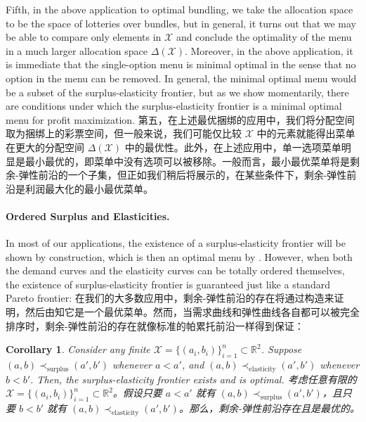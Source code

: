 \documentclass[12pt,letterpaper]{article}
\newenvironment{original}{\color{black}\noindent}{}
\newenvironment{translation}{\color{blue}\noindent}{}
\theoremstyle{plain}
\newtheorem{cor}{Corollary}
\theoremstyle{definition}
\theoremstyle{remark}
\newcommand{\R}{\mathds{R}}
\renewcommand{\1}{\mathds{1}}
\newcommand{\X}{\mathcal{X}}
\theoremstyle{definition}
\begin{document}
\begin{original}
Fifth, in the above application to optimal bundling, we take the allocation space to be the space of lotteries over bundles, but in general, it turns out that we may be able to compare only elements in $\mathcal{X}$ and conclude the optimality of the menu in a much larger allocation space $\Delta(\mathcal{X})$. Moreover, in the above application, it is immediate that the single-option menu is minimal optimal in the sense that no option in the menu can be removed. In general, the minimal optimal menu would be a subset of the surplus-elasticity frontier, but as we show momentarily, there are conditions under which the surplus-elasticity frontier is a minimal optimal menu for profit maximization.
\end{original}
\begin{translation}
第五，在上述最优捆绑的应用中，我们将分配空间取为捆绑上的彩票空间，但一般来说，我们可能仅比较 $\mathcal{X}$ 中的元素就能得出菜单在更大的分配空间 $\Delta(\mathcal{X})$ 中的最优性。此外，在上述应用中，单一选项菜单明显是最小最优的，即菜单中没有选项可以被移除。一般而言，最小最优菜单将是剩余-弹性前沿的一个子集，但正如我们稍后将展示的，在某些条件下，剩余-弹性前沿是利润最大化的最小最优菜单。
\end{translation}

\paragraph{Ordered Surplus and Elasticities.}\hspace{-2mm}\begin{original}In most of our applications, the existence of a surplus-elasticity frontier will be shown by construction, which is then an optimal menu by . However, when both the demand curves and the elasticity curves can be totally ordered themselves, the existence of surplus-elasticity frontier is guaranteed just like a standard Pareto frontier:
\end{original}
\begin{translation}
在我们的大多数应用中，剩余-弹性前沿的存在将通过构造来证明，然后由知它是一个最优菜单。然而，当需求曲线和弹性曲线各自都可以被完全排序时，剩余-弹性前沿的存在就像标准的帕累托前沿一样得到保证：
\end{translation}

\begin{cor}
\begin{original}
Consider any finite $\X = \{(a_i, b_i)\}_{i=1}^n\subset \R^2$.  Suppose $(a, b) \prec_{\text{surplus}} (a', b')$ whenever $a < a'$, and $(a, b) \prec_{\text{elasticity}} (a', b')$ whenever $b < b'$. Then, the surplus-elasticity frontier exists and is optimal.
\end{original}
\begin{translation}
考虑任意有限的 $\X = \{(a_i, b_i)\}_{i=1}^n\subset \R^2$。假设只要 $a < a'$ 就有 $(a, b) \prec_{\text{surplus}} (a', b')$，且只要 $b < b'$ 就有 $(a, b) \prec_{\text{elasticity}} (a', b')$。那么，剩余-弹性前沿存在且是最优的。
\end{translation}
\end{cor}
\end{document}
